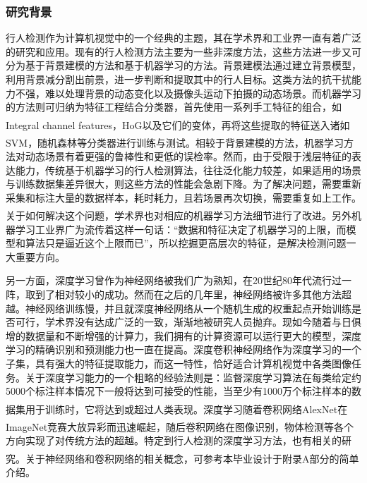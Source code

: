 \documentclass[12pt,a4paper,titlepage]{article}
\newcommand{\upcite}[1]{\textsuperscript{\textsuperscript{\cite{#1}}}}  %
\begin{document}
\subsubsection{研究背景}
行人检测作为计算机视觉中的一个经典的主题，其在学术界和工业界一直有着广泛的研究和应用。现有的行人检测方法主要为一些非深度方法，这些方法进一步又可分为基于背景建模的方法和基于机器学习的方法。背景建模法通过建立背景模型，利用背景减分割出前景，进一步判断和提取其中的行人目标。这类方法的抗干扰能力不强，难以处理背景的动态变化以及摄像头运动下拍摄的动态场景。而机器学习的方法则可归纳为特征工程结合分类器，首先使用一系列手工特征的组合，如Integral channel features\upcite{dollar2009integral}，HoG\upcite{dalal2005histograms}以及它们的变体\upcite{felzenszwalb2010object,schwartz2009human}，再将这些提取的特征送入诸如SVM\upcite{felzenszwalb2010object}，随机森林\upcite{dollar2012crosstalk}等分类器进行训练与测试。相较于背景建模的方法，机器学习方法对动态场景有着更强的鲁棒性和更低的误检率。然而，由于受限于浅层特征的表达能力，传统基于机器学习的行人检测算法，往往泛化能力较差，如果适用的场景与训练数据集差异很大，则这些方法的性能会急剧下降。为了解决问题，需要重新采集和标注大量的数据样本，耗时耗力，且若场景再次切换，需要重复如上工作。关于如何解决这个问题，学术界也对相应的机器学习方法细节进行了改进\upcite{邵松2014基于迁移学习的行人检测研究进展}。另外机器学习工业界广为流传着这样一句话：“数据和特征决定了机器学习的上限，而模型和算法只是逼近这个上限而已”，所以挖掘更高层次的特征，是解决检测问题一大重要方向。\par
另一方面，深度学习曾作为神经网络被我们广为熟知，在20世纪80年代流行过一阵，取到了相对较小的成功。然而在之后的几年里，神经网络被许多其他方法超越。神经网络训练慢，并且就深度神经网络从一个随机生成的权重起点开始训练是否可行，学术界没有达成广泛的一致，渐渐地被研究人员抛弃。现如今随着与日俱增的数据量和不断增强的计算力，我们拥有的计算资源可以运行更大的模型，深度学习的精确识别和预测能力也一直在提高。深度卷积神经网络作为深度学习的一个子集，具有强大的特征提取能力，而这一特性，恰好适合计算机视觉中各类图像任务。关于深度学习能力的一个粗略的经验法则是：监督深度学习算法在每类给定约5000个标注样本情况下一般将达到可接受的性能，当至少有1000万个标注样本的数据集用于训练时，它将达到或超过人类表现\upcite{Goodfellow-et-al-2016}。深度学习随着卷积网络AlexNet\upcite{krizhevsky2012imagenet}在ImageNet竞赛大放异彩而迅速崛起，随后卷积网络在图像识别\upcite{simonyan2014very,he2016deep}，物体检测\upcite{ren15fasterrcnn,redmon2016you,liu2016ssd}等各个方向实现了对传统方法的超越。特定到行人检测的深度学习方法，也有相关的研究\upcite{sermanet2013pedestrian}。关于神经网络和卷积网络的相关概念，可参考本毕业设计于附录A部分的简单介绍。
\end{document}
